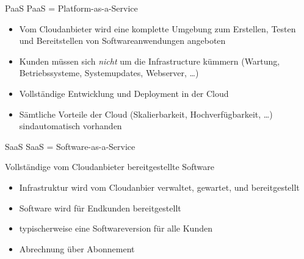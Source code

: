 \begin{flashcard}[Definition]{PaaS}
    PaaS = Platform-as-a-Service

    \begin{itemize}
        \item Vom Cloudanbieter wird eine komplette Umgebung zum Erstellen, Testen und Bereitstellen von Softwareanwendungen angeboten
        \item Kunden müssen sich \emph{nicht} um die Infrastructure kümmern\newline
        (Wartung, Betriebssysteme, Systemupdates, Webserver, \ldots)
        \item Vollständige Entwicklung und Deployment in der Cloud
        \item Sämtliche Vorteile der Cloud (Skalierbarkeit, Hochverfügbarkeit, \ldots) sind\newline automatisch vorhanden
    \end{itemize}
\end{flashcard}

\begin{flashcard}[Definition]{SaaS}
    SaaS = Software-as-a-Service

    Vollständige vom Cloudanbieter bereitgestellte Software
    \begin{itemize}
        \item Infrastruktur wird vom Cloudanbier verwaltet, gewartet, und bereitgestellt
        \item Software wird für Endkunden bereitgestellt
        \item typischerweise eine Softwareversion für alle Kunden
        \item Abrechnung über Abonnement
    \end{itemize}
\end{flashcard}

